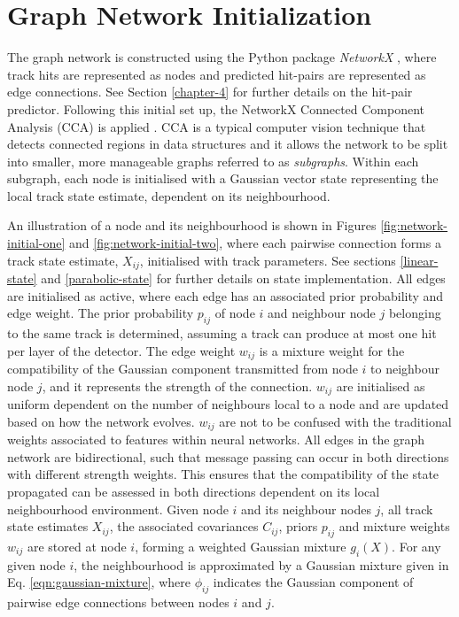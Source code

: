 \section{Graph Network Initialization}
\label{gnn-network-initialization}

The graph network is constructed using the Python package \textit{NetworkX} \cite{SciPyProceedings_11}, where track hits are represented as nodes and predicted hit-pairs are represented as edge connections. See Section \ref{chapter-4} for further details on the hit-pair predictor. Following this initial set up, the NetworkX Connected Component Analysis (CCA) is applied \cite{networkx}. CCA is a typical computer vision technique that detects connected regions in data structures and it allows the network to be split into smaller, more manageable graphs referred to as \textit{subgraphs}. Within each subgraph, each node is initialised with a Gaussian vector state representing the local track state estimate, dependent on its neighbourhood. 

An illustration of a node and its neighbourhood is shown in Figures \ref{fig:network-initial-one} and \ref{fig:network-initial-two}, where each pairwise connection forms a track state estimate, $X_{ij}$, initialised with track parameters. See sections \ref{linear-state} and \ref{parabolic-state} for further details on state implementation. All edges are initialised as active, where each edge has an associated prior probability and edge weight. The prior probability $p_{ij}$ of node $i$ and neighbour node $j$ belonging to the same track is determined, assuming a track can produce at most one hit per layer of the detector. The edge weight $w_{ij}$ is a mixture weight for the compatibility of the Gaussian component transmitted from node $i$ to neighbour node $j$, and it represents the strength of the connection. $w_{ij}$ are initialised as uniform dependent on the number of neighbours local to a node and are updated based on how the network evolves. $w_{ij}$ are not to be confused with the traditional weights associated to features within neural networks. All edges in the graph network are bidirectional, such that message passing can occur in both directions with different strength weights. This ensures that the compatibility of the state propagated can be assessed in both directions dependent on its local neighbourhood environment. Given node $i$ and its neighbour nodes $j$, all track state estimates $X_{ij}$, the associated covariances $C_{ij}$, priors $p_{ij}$ and mixture weights $w_{ij}$ are stored at node $i$, forming a weighted Gaussian mixture $g_i(X)$. For any given node $i$, the neighbourhood is approximated by a Gaussian mixture given in Eq. \eqref{eqn:gaussian-mixture}, where $\phi_{ij}$ indicates the Gaussian component of pairwise edge connections between nodes $i$ and $j$.


